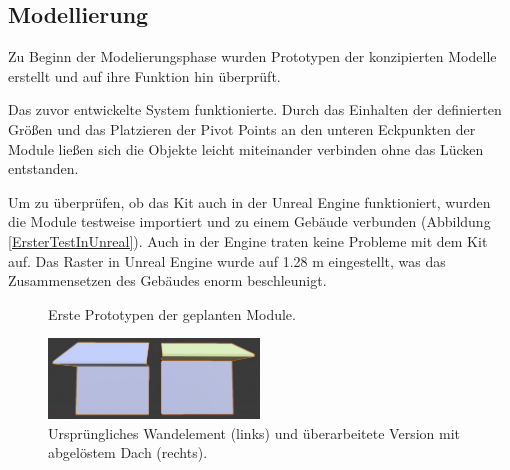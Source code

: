 \subsection{Modellierung}
Zu Beginn der Modelierungsphase wurden Prototypen der konzipierten Modelle erstellt und auf ihre Funktion hin überprüft.
\par
Das zuvor entwickelte System funktionierte. Durch das Einhalten der definierten Größen und das Platzieren der Pivot Points an den unteren Eckpunkten der Module ließen sich die Objekte leicht miteinander verbinden ohne das Lücken entstanden.
\par
Um zu überprüfen, ob das Kit auch in der Unreal Engine funktioniert, wurden die Module testweise importiert und zu einem Gebäude verbunden (Abbildung \ref{ErsterTestInUnreal}). Auch in der Engine traten keine Probleme mit dem Kit auf. Das Raster in Unreal Engine wurde auf 1.28 m eingestellt, was das Zusammensetzen des Gebäudes enorm beschleunigt.
\begin{figure}[H]
\centering
  \qquad
  \caption{Erste Prototypen der geplanten Module.}%
\label{ErsterModulTest}
\end{figure}
\vspace{-10.5pt}
\begin{figure}
  \centering 
  \vspace{-11.5pt}
    \includegraphics[width=0.5\textwidth]{bilder/Wallrework}
      \caption{Ursprüngliches Wandelement (links) und überarbeitete Version mit abgelöstem Dach (rechts).}\label{Wallrework}
          \vspace{-10pt}
\end{figure}
